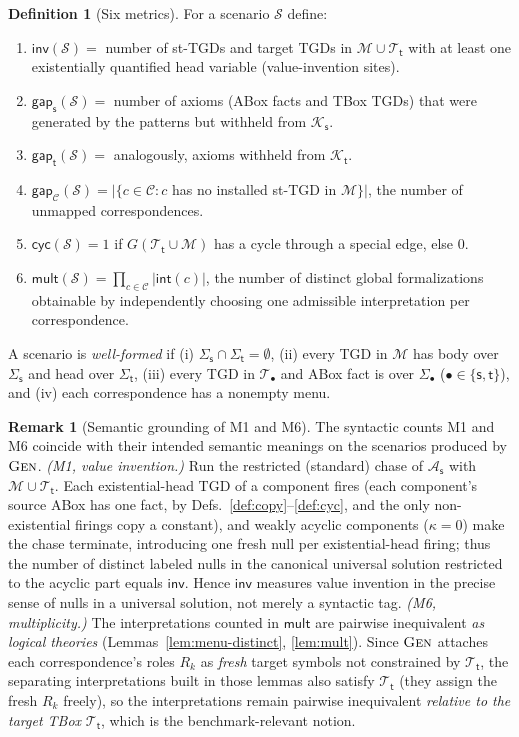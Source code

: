 \documentclass{amsart}
\theoremstyle{definition}
\newtheorem{definition}{Definition}
\newtheorem{remark}{Remark}
\newcommand{\Tbox}{\mathcal{T}}
\newcommand{\Abox}{\mathcal{A}}
\newcommand{\KB}{\mathcal{K}}
\newcommand{\Sig}{\Sigma}
\newcommand{\Map}{\mathcal{M}}
\newcommand{\src}{\mathsf{s}}
\newcommand{\trg}{\mathsf{t}}
\newcommand{\Scn}{\mathcal{S}}
\newcommand{\Cor}{\mathcal{C}}
\begin{document}
\begin{definition}[Six metrics]\label{def:metrics}
For a scenario $\Scn$ define:
\begin{enumerate}[label=\textbf{M\arabic*.},nosep]
\item $\mathsf{inv}(\Scn)=$ number of st-TGDs and target TGDs in
$\Map\cup\Tbox_\trg$ with at least one existentially quantified head variable
(value-invention sites).
\item $\mathsf{gap}_\src(\Scn)=$ number of axioms (ABox facts and TBox TGDs) that
were generated by the patterns but withheld from $\KB_\src$.
\item $\mathsf{gap}_\trg(\Scn)=$ analogously, axioms withheld from $\KB_\trg$.
\item $\mathsf{gap}_\Cor(\Scn)=|\{c\in\Cor : c$ has no installed st-TGD in
$\Map\}|$, the number of unmapped correspondences.
\item $\mathsf{cyc}(\Scn)=1$ if $G(\Tbox_\trg\cup\Map)$ has a cycle through a
special edge, else $0$.
\item $\mathsf{mult}(\Scn)=\prod_{c\in\Cor}|\mathsf{int}(c)|$, the number of
distinct global formalizations obtainable by independently choosing one admissible
interpretation per correspondence.
\end{enumerate}
A scenario is \emph{well-formed} if (i) $\Sig_\src\cap\Sig_\trg=\emptyset$, (ii)
every TGD in $\Map$ has body over $\Sig_\src$ and head over $\Sig_\trg$, (iii)
every TGD in $\Tbox_\bullet$ and ABox fact is over $\Sig_\bullet$
($\bullet\in\{\src,\trg\}$), and (iv) each correspondence has a nonempty menu.
\end{definition}

\begin{remark}[Semantic grounding of M1 and M6]\label{rem:semantic}
The syntactic counts M1 and M6 coincide with their intended semantic meanings on
the scenarios produced by $\textsc{Gen}$.
\emph{(M1, value invention.)} Run the restricted (standard) chase of
$\Abox_\src$ with $\Map\cup\Tbox_\trg$. Each existential-head TGD of a component
fires (each component's source ABox has one fact, by
Defs.~\ref{def:copy}--\ref{def:cyc}, and the only non-existential firings copy a
constant), and weakly acyclic components ($\kappa=0$) make the chase terminate,
introducing one fresh null per existential-head firing; thus the number of
distinct labeled nulls in the canonical universal solution restricted to the
acyclic part equals $\mathsf{inv}$. Hence $\mathsf{inv}$ measures value invention
in the precise sense of nulls in a universal solution, not merely a syntactic tag.
\emph{(M6, multiplicity.)} The interpretations counted in $\mathsf{mult}$ are
pairwise inequivalent \emph{as logical theories} (Lemmas~\ref{lem:menu-distinct},
\ref{lem:mult}). Since $\textsc{Gen}$ attaches each correspondence's roles
$R_k$ as \emph{fresh} target symbols not constrained by $\Tbox_\trg$, the
separating interpretations built in those lemmas also satisfy $\Tbox_\trg$
(they assign the fresh $R_k$ freely), so the interpretations remain pairwise
inequivalent \emph{relative to the target TBox} $\Tbox_\trg$, which is the
benchmark-relevant notion.
\end{remark}
\end{document}
